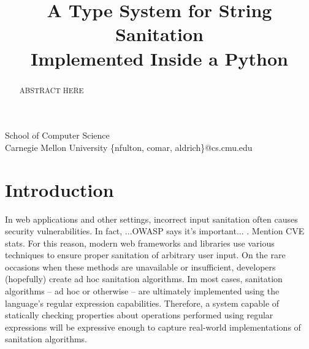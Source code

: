 \documentclass[10pt,preprint]{sigplanconf}
\theoremstyle{definition}
\begin{document}
\conferenceinfo{-}{-} 
\copyrightyear{-} 
\copyrightdata{[to be supplied]} 


\newcommand{\Ace}{\textsf{Ace}}

\title{A Type System for String Sanitation\\Implemented Inside a Python}

           {School of Computer Science\\
            Carnegie Mellon University}
           {\{nfulton, comar, aldrich\}@cs.cmu.edu}

\maketitle
\begin{abstract}
ABSTRACT HERE
\end{abstract}

\section{Introduction}\label{intro}
In web applications and other settings, incorrect input sanitation often causes
security vulnerabilities. In fact, ...OWASP says it's important... .
Mention CVE stats.
For this reason, modern web frameworks and libraries use various techniques to
ensure proper sanitation of arbitrary user input. On the rare occasions when
these methods are unavailable or insufficient, developers (hopefully) create 
ad hoc sanitation algorithms. Im most cases, sanitation algorithms -- ad hoc 
or otherwise -- are ultimately implemented using the language's regular
expression capabilities. Therefore, a system capable of statically 
checking properties about operations performed using regular expressions will
be expressive enough to capture real-world implementations of sanitation 
algorithms.
\end{document}
